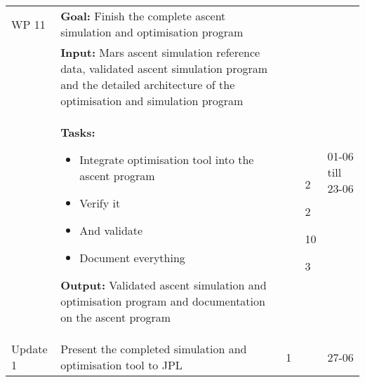 \begin{longtable}{|p{2cm}|p{10cm}|p{1cm}|p{1cm}|}

WP 11 & \textbf{Goal:} Finish the complete ascent simulation and optimisation program &  & \multirow{3}{1cm}{01-06 till 23-06} \\ 
&\textbf{Input:} Mars ascent simulation reference data, validated ascent simulation program and the detailed architecture of the optimisation and simulation program & & \\
& \textbf{Tasks:}
\begin{itemize}
\item Integrate optimisation tool into the ascent program
\item Verify it
\item And validate
\item Document everything
\end{itemize} 
\textbf{Output:} Validated ascent simulation and optimisation program and documentation on the ascent program & \noindent \begin{itemize}[leftmargin=*]
\item[2] 
\item[2]
\item[10]
\item[3]
\end{itemize} & \\ \hline


Update 1 & Present the completed simulation and optimisation tool to \ac{JPL} & 1 & 27-06 \\ \hline



\end{longtable}

